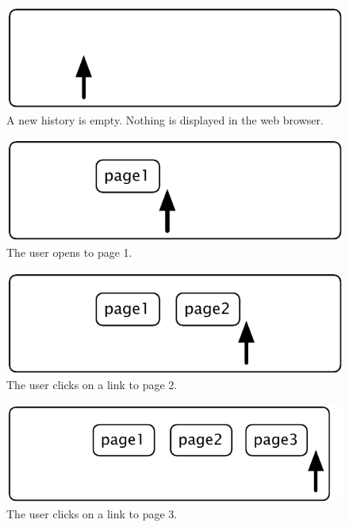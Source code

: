 \documentclass[a4paper,10pt,twoside]{book}
\begin{document}
\begin{figure}[!ht]
\centerline{\includegraphics[scale=0.5]{emptyStef}}
\caption{A new history is empty. Nothing is displayed in the web browser.}
\vspace{.2in}
\end{figure}

\begin{figure}[!ht]
\centerline{\includegraphics[scale=0.5]{page1Stef}}
\caption{The user opens to page 1.}
\vspace{.2in}
\end{figure}

\begin{figure}[!ht]
\centerline{\includegraphics[scale=0.5]{page2Stef}}
\caption{The user clicks on a link to page 2.}
\vspace{.2in}
\end{figure}

\begin{figure}[!ht]
\centerline{\includegraphics[scale=0.5]{page3Stef}}
\caption{The user clicks on a link to page 3.}
\vspace{.2in}
\end{figure}
\end{document}
